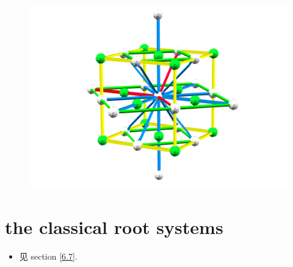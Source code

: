 \begin{itemize}
	\begin{figure}[H]
		\centering
		\includegraphics[scale=0.2]{figures/the Weyl group of C3.pdf}
	\end{figure}
\end{itemize}

\section{the classical root systems}
\begin{itemize}
	\item 见 section \ref{6.7}.
\end{itemize}

